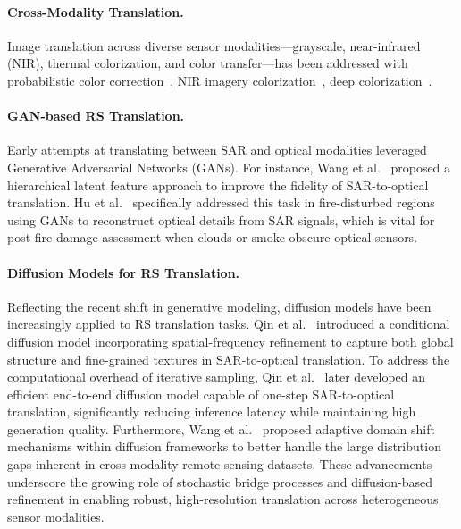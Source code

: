 \paragraph{Cross-Modality Translation.}
Image translation across diverse sensor modalities---grayscale, near-infrared (NIR), thermal colorization, and color transfer---has been addressed with probabilistic color correction~\cite{oliveiraProbabilisticApproachColor2015}, NIR imagery colorization~\cite{suarezInfraRedImageryColorization2018}, deep colorization~\cite{zhangColorfulImageColorization2016,majumder2020deep}. 

\paragraph{GAN-based RS Translation.}
Early attempts at translating between SAR and optical modalities leveraged Generative Adversarial Networks (GANs). For instance, Wang et al.~\cite{wangSARtoOpticalImageTranslation2022} proposed a hierarchical latent feature approach to improve the fidelity of SAR-to-optical translation. Hu et al.~\cite{huGanbasedSAROptical2022} specifically addressed this task in fire-disturbed regions using GANs to reconstruct optical details from SAR signals, which is vital for post-fire damage assessment when clouds or smoke obscure optical sensors.

\paragraph{Diffusion Models for RS Translation.}
Reflecting the recent shift in generative modeling, diffusion models have been increasingly applied to RS translation tasks. Qin et al.~\cite{qinConditionalDiffusionModel2024} introduced a conditional diffusion model incorporating spatial-frequency refinement to capture both global structure and fine-grained textures in SAR-to-optical translation. To address the computational overhead of iterative sampling, Qin et al.~\cite{qinEfficientEndtoEndDiffusion2025} later developed an efficient end-to-end diffusion model capable of one-step SAR-to-optical translation, significantly reducing inference latency while maintaining high generation quality. Furthermore, Wang et al.~\cite{wangAdaptiveDomainShift2026a} proposed adaptive domain shift mechanisms within diffusion frameworks to better handle the large distribution gaps inherent in cross-modality remote sensing datasets. These advancements underscore the growing role of stochastic bridge processes and diffusion-based refinement in enabling robust, high-resolution translation across heterogeneous sensor modalities.


